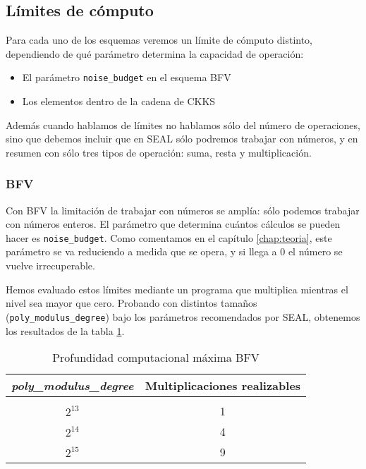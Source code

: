\subsection{Límites de cómputo}

Para cada uno de los esquemas veremos un límite de cómputo distinto, dependiendo de qué parámetro determina la capacidad de operación:

\begin{itemize}
    \item El parámetro \verb|noise_budget| en el esquema BFV
    \item Los elementos dentro de la cadena de CKKS
\end{itemize}

Además cuando hablamos de límites no hablamos sólo del número de operaciones, sino que debemos incluir que en SEAL sólo podremos trabajar con números, y en resumen con sólo tres tipos de operación: suma, resta y multiplicación.

\subsubsection{BFV}

Con BFV la limitación de trabajar con números se amplía: sólo podemos trabajar con números enteros. El parámetro que determina cuántos cálculos se pueden hacer es \verb|noise_budget|. Como comentamos en el capítulo \ref{chap:teoria}, este parámetro se va reduciendo a medida que se opera, y si llega a 0 el número se vuelve irrecuperable.

Hemos evaluado estos límites mediante un programa que multiplica mientras el nivel sea mayor que cero. Probando con distintos tamaños (\verb|poly_modulus_degree|) bajo los parámetros recomendados por SEAL, obtenemos los resultados de la tabla \ref{table:seal_bfv_mult_depth}.

\begin{table}[]
    \centering
    \begin{tabular}{c c}
        \textit{poly\_modulus\_degree}   & Multiplicaciones realizables  \\
        \hline \hline \\
        $2^{13}$  & 1 \\
        $2^{14}$  & 4 \\
        $2^{15}$  & 9
    \end{tabular}
    \caption{Profundidad computacional máxima BFV}
    \label{table:seal_bfv_mult_depth}
\end{table}

